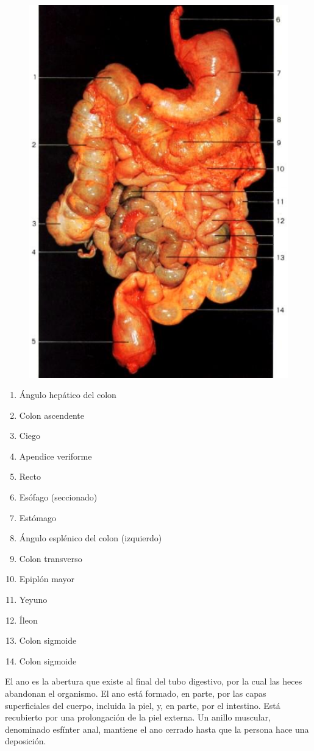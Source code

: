 \begin{figure}[H]
	\begin{center}
 		\includegraphics[width = .7\textwidth]{v2/images/image58.png}
	\end{center} 
\end{figure}
\begin{enumerate}
    \item Ángulo hepático del colon
    \item Colon ascendente
    \item Ciego
    \item Apendice veriforme
    \item Recto
    \item Esófago (seccionado)
    \item Estómago
    \item Ángulo esplénico del colon (izquierdo)
    \item Colon transverso
    \item Epiplón mayor
    \item Yeyuno
    \item Íleon
    \item Colon sigmoide
    \item Colon sigmoide    
\end{enumerate}
El ano es la abertura que existe al final del tubo digestivo, por la cual las heces abandonan el organismo. El ano está formado, en parte, por las capas superficiales del cuerpo, 
incluida la piel, y, en parte, por el intestino. Está recubierto por una prolongación de la piel externa. Un anillo muscular, denominado esfínter anal, mantiene el ano cerrado hasta 
que la persona hace una deposición.

